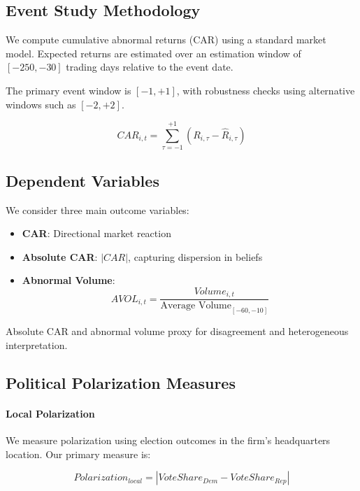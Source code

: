 \subsection{Event Study Methodology}

We compute cumulative abnormal returns (CAR) using a standard market model. Expected returns are estimated over an estimation window of $[-250,-30]$ trading days relative to the event date.

The primary event window is $[-1,+1]$, with robustness checks using alternative windows such as $[-2,+2]$.

\begin{equation}
CAR_{i,t} = \sum_{\tau=-1}^{+1} (R_{i,\tau} - \hat{R}_{i,\tau})
\end{equation}

\subsection{Dependent Variables}

We consider three main outcome variables:

\begin{itemize}
    \item \textbf{CAR}: Directional market reaction
    \item \textbf{Absolute CAR}: $|CAR|$, capturing dispersion in beliefs
    \item \textbf{Abnormal Volume}: 
    \[
    AVOL_{i,t} = \frac{Volume_{i,t}}{\text{Average Volume}_{[-60,-10]}}
    \]
\end{itemize}

Absolute CAR and abnormal volume proxy for disagreement and heterogeneous interpretation.

\subsection{Political Polarization Measures}

\paragraph{Local Polarization}

We measure polarization using election outcomes in the firm's headquarters location. Our primary measure is:

\begin{equation}
Polarization_{local} = |VoteShare_{Dem} - VoteShare_{Rep}|
\end{equation}

